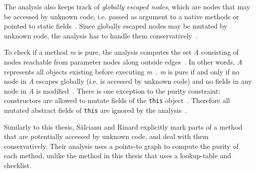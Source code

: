 \documentclass[a4paper,12pt]{article}
\begin{document}

The analysis also keeps track of \textit{globally escaped nodes}, which are nodes that may be accessed by unknown code, i.e. passed as argument to a native methods or pointed to static fields~\cite{salcianu}. Since globally escaped nodes may be mutated by unknown code, the analysis has to handle them conservatively~\cite{salcianu}.

To check if a method \textit{m} is pure, the analysis computes the set \textit{A} consisting of nodes reachable from parameter nodes along outside edges~\cite{salcianu}. In other words, \textit{A} represents all objects existing before executing \textit{m}~\cite{salcianu}. \textit{m} is pure if and only if no node in \textit{A} escapes globally (i.e. is accessed by unknown code) and no fields in any node in \textit{A} is modified~\cite{salcianu}. There is one exception to the purity constraint: constructors are allowed to mutate fields of the \texttt{this} object~\cite{salcianu}. Therefore all mutated abstract fields of \texttt{this} are ignored by the analysis~\cite{salcianu}.

Similarly to this thesis, S\u{a}lcianu and Rinard explicitly mark parts of a method that are potentially accessed by unknown code, and deal with them conservatively. Their analysis uses a points-to graph to compute the purity of each method, unlike the method in this thesis that uses a lookup-table and checklist.



\end{document}
